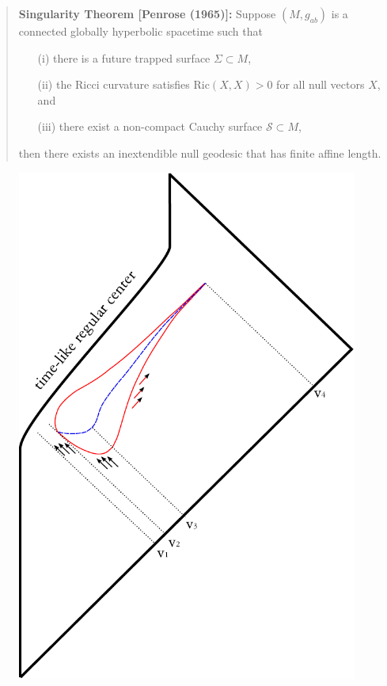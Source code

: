 \documentclass[12pt]{article}
\newcommand{\2}{$^2$}
\newcommand{\3}{$^3$}
\newcommand{\4}{$_4$}
\newcommand{\5}{$_5$}
\begin{document}
\begin{quote}
\textbf{Singularity Theorem [Penrose (1965)]:} Suppose $(M, g_{ab})$ is a connected globally hyperbolic spacetime such that
\begin{itemize}
\item[(i)] there is a future trapped surface $\Sigma \subset M$,
\item[(ii)] the Ricci curvature satisfies $\text{Ric}(X,X)>0$ for all null vectors $X$, and
\item[(iii)] there exist a non-compact Cauchy surface $\mathcal{S} \subset M$, 
\end{itemize}
then there exists an inextendible null geodesic that has finite affine length. 
\end{quote}

\begin{figure}
\begin{center}
\includegraphics[scale=0.9]{regular_2-eps-converted-to.pdf}

\end{center}
\end{figure}
\end{document}
